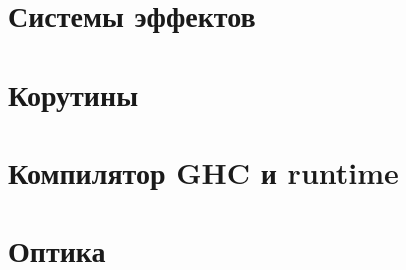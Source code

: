 \documentclass[12pt]{article}
\begin{document}






    \section{Системы эффектов} \label{sec:effect-systems}



    \section{Корутины}




    \section{Компилятор GHC и runtime}





    \section{Оптика}






\end{document}
